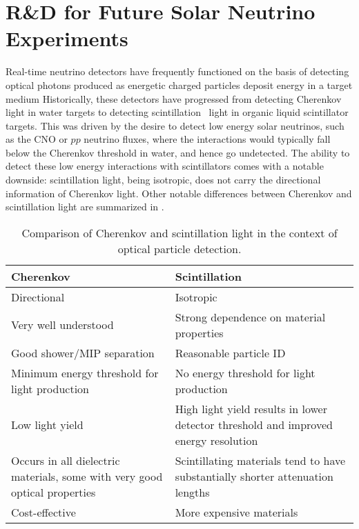\chapter{R\&D for Future Solar Neutrino Experiments}
\label{ch:wbls}

Real-time neutrino detectors have frequently functioned on the basis of detecting optical photons produced as energetic charged particles deposit energy in a target medium
Historically, these detectors have progressed from detecting Cherenkov~\cite{cherenkov} light in water targets to detecting scintillation~\cite{birks} light in organic liquid scintillator targets.
This was driven by the desire to detect low energy solar neutrinos, such as the CNO or $pp$ neutrino fluxes, where the interactions would typically fall below the Cherenkov threshold in water, and hence go undetected.
The ability to detect these low energy interactions with scintillators comes with a notable downside: scintillation light, being isotropic, does not carry the directional information of Cherenkov light.
Other notable differences between Cherenkov and scintillation light are summarized in .

\begin{table}
\begin{tabularx}{\textwidth}{CC}
Cherenkov & Scintillation \\
\hline
\hline
Directional & Isotropic\\
\hline
Very well understood  & Strong dependence on material properties  \\
\hline
Good shower/MIP separation & Reasonable particle ID  \\
\hline
Minimum energy threshold for light production & No energy threshold for light production  \\
\hline
Low light yield & High light yield results in lower detector threshold and improved energy resolution \\
\hline
Occurs in all dielectric materials, some with very good optical properties & Scintillating materials tend to have substantially shorter attenuation lengths  \\
\hline
Cost-effective & More expensive materials \\
\end{tabularx}
\caption{Comparison of Cherenkov and scintillation light in the context of optical particle detection.}
\label{tab:chervsscint}
\end{table}

